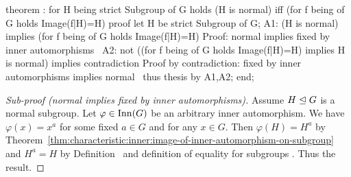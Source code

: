 \nwenddocs{}\endmoddef\nwstartdeflinemarkup{}\nwenddeflinemarkup
theorem :
  for H being strict Subgroup of G
  holds (H is normal) iff (for f being   of G
                           holds Image(f|H)=H)
proof
  let H be strict Subgroup of G;
  A1: (H is normal) implies (for f being   of G
                             holds Image(f|H)=H)
  \LA{}Proof: normal implies fixed by inner automorphisms~{\nwtagstyle{}}\RA{}
  A2: not ((for f being   of G holds Image(f|H)=H)
           implies H is normal)
  implies contradiction
  \LA{}Proof by contradiction: fixed by inner automorphisms implies normal~{\nwtagstyle{}}\RA{}
  thus thesis by A1,A2;
end;
\eatline
{}\nwendcode{}\nwdocspar
\begin{proof}[Sub-proof (normal implies fixed by inner automorphisms)]
Assume $H\trianglelefteq G$ is a normal subgroup. Let
$\varphi\in\operatorname{Inn}(G)$ be an arbitrary inner automorphism. We have
$\varphi(x)=x^{a}$ for some fixed $a\in G$ and for any $x\in G$. Then
$\varphi(H) = H^{a}$ by Theorem~\ref{thm:characteristic:inner:image-of-inner-automorphism-on-subgroup} and $H^{a}=H$ by Definition~%
 and definition of equality for
subgroups . Thus the result.
\end{proof}

